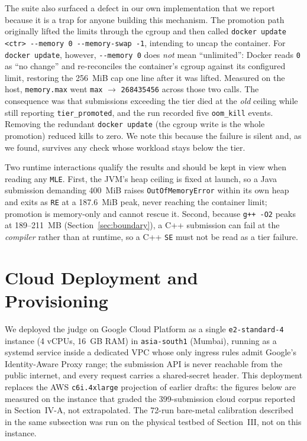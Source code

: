 \documentclass[conference]{IEEEtran}
\begin{document}
The suite also surfaced a defect in our own implementation that we report because it is a trap for anyone building this mechanism. The promotion path originally lifted the limits through the cgroup and then called \texttt{docker update <ctr> -{}-memory 0 -{}-memory-swap -1}, intending to uncap the container. For \texttt{docker update}, however, \texttt{-{}-memory 0} does \emph{not} mean ``unlimited'': Docker reads \texttt{0} as ``no change'' and re-reconciles the container's cgroup against its configured limit, restoring the 256~MiB cap one line after it was lifted. Measured on the host, \texttt{memory.max} went \texttt{max} $\rightarrow$ \texttt{268435456} across those two calls. The consequence was that submissions exceeding the tier died at the \emph{old} ceiling while still reporting \texttt{tier\_promoted}, and the run recorded five \texttt{oom\_kill} events. Removing the redundant \texttt{docker update} (the cgroup write is the whole promotion) reduced kills to zero. We note this because the failure is silent and, as we found, survives any check whose workload stays below the tier.

Two runtime interactions qualify the results and should be kept in view when reading any \texttt{MLE}. First, the JVM's heap ceiling is fixed at launch, so a Java submission demanding 400~MiB raises \texttt{OutOfMemoryError} within its own heap and exits as \texttt{RE} at a 187.6~MiB peak, never reaching the container limit; promotion is memory-only and cannot rescue it. Second, because \texttt{g++ -O2} peaks at 189--211~MB (Section~\ref{sec:boundary}), a C++ submission can fail at the \emph{compiler} rather than at runtime, so a C++ \texttt{SE} must not be read as a tier failure.

\section{Cloud Deployment and Provisioning}
\label{sec:cloud}
We deployed the judge on Google Cloud Platform as a single \texttt{e2-standard-4} instance (4 vCPUs, 16~GB RAM) in \texttt{asia-south1} (Mumbai), running as a systemd service inside a dedicated VPC whose only ingress rules admit Google's Identity-Aware Proxy range; the submission API is never reachable from the public internet, and every request carries a shared-secret header. This deployment replaces the AWS \texttt{c6i.4xlarge} projection of earlier drafts: the figures below are measured on the instance that graded the 399-submission cloud corpus reported in Section~IV-A, not extrapolated. The 72-run bare-metal calibration described in the same subsection was run on the physical testbed of Section~III, not on this instance.
\end{document}
